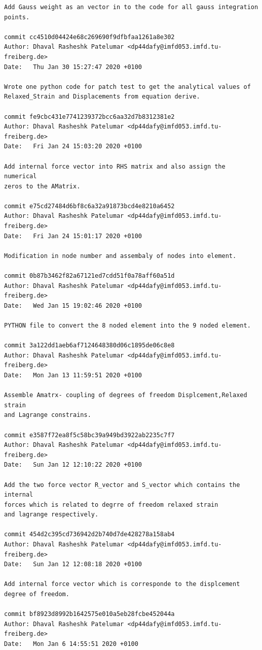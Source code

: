 \documentclass[12pt]{article}
\begin{document}
\begin{appendices}
\begin{verbatim}
Add Gauss weight as an vector in to the code for all gauss integration points.

commit cc4510d04424e68c269690f9dfbfaa1261a8e302
Author: Dhaval Rasheshk Patelumar <dp44dafy@imfd053.imfd.tu-freiberg.de>
Date:   Thu Jan 30 15:27:47 2020 +0100

Wrote one python code for patch test to get the analytical values of 
Relaxed_Strain and Displacements from equation derive.

commit fe9cbc431e7741239372bcc6aa32d7b8312381e2
Author: Dhaval Rasheshk Patelumar <dp44dafy@imfd053.imfd.tu-freiberg.de>
Date:   Fri Jan 24 15:03:20 2020 +0100

Add internal force vector into RHS matrix and also assign the numerical 
zeros to the AMatrix.

commit e75cd27484d6bf8c6a32a91873bcd4e8210a6452
Author: Dhaval Rasheshk Patelumar <dp44dafy@imfd053.imfd.tu-freiberg.de>
Date:   Fri Jan 24 15:01:17 2020 +0100

Modification in node number and assembaly of nodes into element.

commit 0b87b3462f82a67121ed7cdd51f0a78aff60a51d
Author: Dhaval Rasheshk Patelumar <dp44dafy@imfd053.imfd.tu-freiberg.de>
Date:   Wed Jan 15 19:02:46 2020 +0100

PYTHON file to convert the 8 noded element into the 9 noded element.

commit 3a122dd1aeb6af7124648380d06c1895de06c8e8
Author: Dhaval Rasheshk Patelumar <dp44dafy@imfd053.imfd.tu-freiberg.de>
Date:   Mon Jan 13 11:59:51 2020 +0100

Assemble Amatrx- coupling of degrees of freedom Displcement,Relaxed strain
and Lagrange constrains.

commit e3587f72ea8f5c58bc39a949bd3922ab2235c7f7
Author: Dhaval Rasheshk Patelumar <dp44dafy@imfd053.imfd.tu-freiberg.de>
Date:   Sun Jan 12 12:10:22 2020 +0100

Add the two force vector R_vector and S_vector which contains the internal 
forces which is related to degrre of freedom relaxed strain 
and lagrange respectively.

commit 454d2c395cd736942d2b740d7de428278a158ab4
Author: Dhaval Rasheshk Patelumar <dp44dafy@imfd053.imfd.tu-freiberg.de>
Date:   Sun Jan 12 12:08:18 2020 +0100

Add internal force vector which is corresponde to the displcement degree of freedom.

commit bf8923d8992b1642575e010a5eb28fcbe452044a
Author: Dhaval Rasheshk Patelumar <dp44dafy@imfd053.imfd.tu-freiberg.de>
Date:   Mon Jan 6 14:55:51 2020 +0100


\end{verbatim}
\end{appendices}
\end{document}
